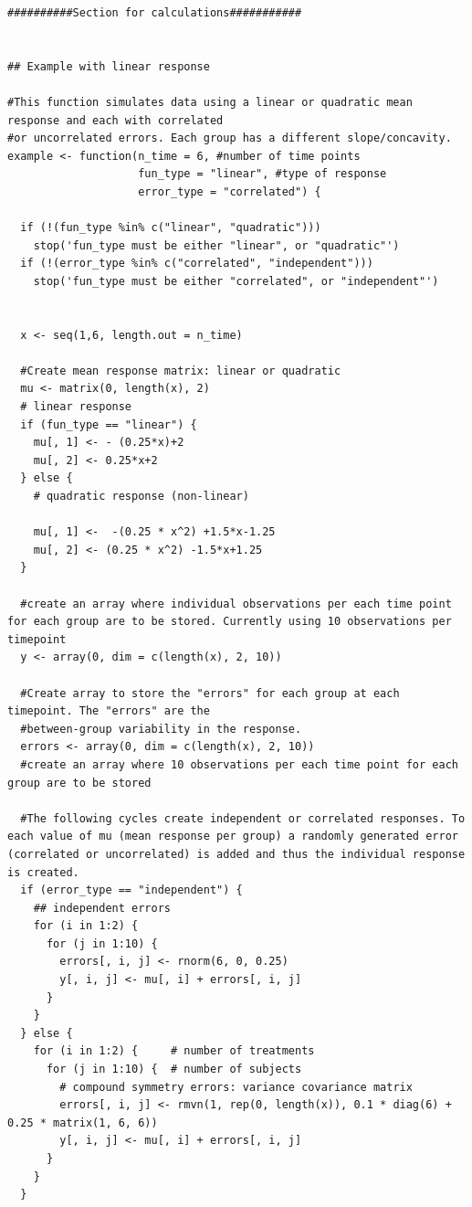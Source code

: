 \documentclass[Royal,times,sagev]{sagej}
\begin{document}
\begin{verbatim}
##########Section for calculations###########


## Example with linear response

#This function simulates data using a linear or quadratic mean response and each with correlated
#or uncorrelated errors. Each group has a different slope/concavity.
example <- function(n_time = 6, #number of time points
                    fun_type = "linear", #type of response
                    error_type = "correlated") {
  
  if (!(fun_type %in% c("linear", "quadratic")))
    stop('fun_type must be either "linear", or "quadratic"')
  if (!(error_type %in% c("correlated", "independent")))
    stop('fun_type must be either "correlated", or "independent"')
  
  
  x <- seq(1,6, length.out = n_time)
  
  #Create mean response matrix: linear or quadratic
  mu <- matrix(0, length(x), 2)
  # linear response
  if (fun_type == "linear") {
    mu[, 1] <- - (0.25*x)+2  
    mu[, 2] <- 0.25*x+2
  } else {
    # quadratic response (non-linear)
    
    mu[, 1] <-  -(0.25 * x^2) +1.5*x-1.25
    mu[, 2] <- (0.25 * x^2) -1.5*x+1.25
  }
  
  #create an array where individual observations per each time point for each group are to be stored. Currently using 10 observations per timepoint
  y <- array(0, dim = c(length(x), 2, 10))
  
  #Create array to store the "errors" for each group at each timepoint. The "errors" are the 
  #between-group variability in the response.
  errors <- array(0, dim = c(length(x), 2, 10))
  #create an array where 10 observations per each time point for each group are to be stored
  
  #The following cycles create independent or correlated responses. To each value of mu (mean response per group) a randomly generated error (correlated or uncorrelated) is added and thus the individual response is created.
  if (error_type == "independent") {
    ## independent errors
    for (i in 1:2) {
      for (j in 1:10) {
        errors[, i, j] <- rnorm(6, 0, 0.25)
        y[, i, j] <- mu[, i] + errors[, i, j]
      }
    }
  } else {
    for (i in 1:2) {     # number of treatments
      for (j in 1:10) {  # number of subjects
        # compound symmetry errors: variance covariance matrix
        errors[, i, j] <- rmvn(1, rep(0, length(x)), 0.1 * diag(6) + 0.25 * matrix(1, 6, 6))
        y[, i, j] <- mu[, i] + errors[, i, j]
      }
    }
  }    
  

\end{verbatim}
\end{document}
